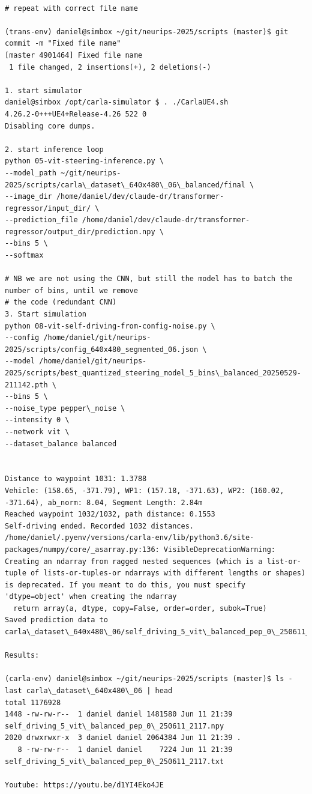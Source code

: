 \begin{verbatim}

# repeat with correct file name

(trans-env) daniel@simbox ~/git/neurips-2025/scripts (master)$ git commit -m "Fixed file name"
[master 4901464] Fixed file name
 1 file changed, 2 insertions(+), 2 deletions(-)
 
1. start simulator
daniel@simbox /opt/carla-simulator $ . ./CarlaUE4.sh 
4.26.2-0+++UE4+Release-4.26 522 0
Disabling core dumps.

2. start inference loop
python 05-vit-steering-inference.py \
--model_path ~/git/neurips-2025/scripts/carla\_dataset\_640x480\_06\_balanced/final \
--image_dir /home/daniel/dev/claude-dr/transformer-regressor/input_dir/ \
--prediction_file /home/daniel/dev/claude-dr/transformer-regressor/output_dir/prediction.npy \
--bins 5 \
--softmax

# NB we are not using the CNN, but still the model has to batch the number of bins, until we remove
# the code (redundant CNN)
3. Start simulation
python 08-vit-self-driving-from-config-noise.py \
--config /home/daniel/git/neurips-2025/scripts/config_640x480_segmented_06.json \
--model /home/daniel/git/neurips-2025/scripts/best_quantized_steering_model_5_bins\_balanced_20250529-211142.pth \
--bins 5 \
--noise_type pepper\_noise \
--intensity 0 \
--network vit \
--dataset_balance balanced


Distance to waypoint 1031: 1.3788
Vehicle: (158.65, -371.79), WP1: (157.18, -371.63), WP2: (160.02, -371.64), ab_norm: 8.04, Segment Length: 2.84m
Reached waypoint 1032/1032, path distance: 0.1553
Self-driving ended. Recorded 1032 distances.
/home/daniel/.pyenv/versions/carla-env/lib/python3.6/site-packages/numpy/core/_asarray.py:136: VisibleDeprecationWarning: Creating an ndarray from ragged nested sequences (which is a list-or-tuple of lists-or-tuples-or ndarrays with different lengths or shapes) is deprecated. If you meant to do this, you must specify 'dtype=object' when creating the ndarray
  return array(a, dtype, copy=False, order=order, subok=True)
Saved prediction data to carla\_dataset\_640x480\_06/self_driving_5_vit\_balanced_pep_0\_250611_2117.npy

Results:

(carla-env) daniel@simbox ~/git/neurips-2025/scripts (master)$ ls -last carla\_dataset\_640x480\_06 | head
total 1176928
1448 -rw-rw-r--  1 daniel daniel 1481580 Jun 11 21:39 self_driving_5_vit\_balanced_pep_0\_250611_2117.npy
2020 drwxrwxr-x  3 daniel daniel 2064384 Jun 11 21:39 .
   8 -rw-rw-r--  1 daniel daniel    7224 Jun 11 21:39 self_driving_5_vit\_balanced_pep_0\_250611_2117.txt

Youtube: https://youtu.be/d1YI4Eko4JE

\end{verbatim}


